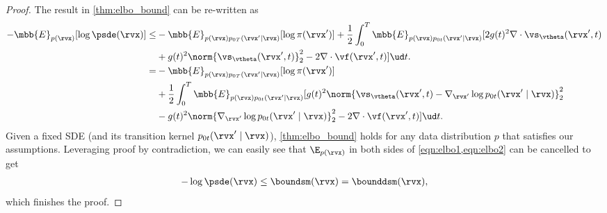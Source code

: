 \pointelbo*
\begin{proof}
The result in \cref{thm:elbo_bound} can be re-written as
\begin{align*}
-\mbb{E}_{p(\rvx)}[\log \psde(\rvx)] 
\leq & -\mbb{E}_{p(\rvx)p_{0T}(\rvx' \mid \rvx)}[\log \pi(\rvx')] 
+ \frac{1}{2}\int_{0}^T \mbb{E}_{p(\rvx)p_{0t}(\rvx'\mid \rvx)}[2g(t)^2 \nabla \cdot \vs_\vtheta(\rvx', t) \notag \\
&+ g(t)^2 \norm{\vs_\vtheta(\rvx', t)}_2^2 -2 \nabla \cdot \vf(\rvx', t)] \ud t.\\
=&  -\mbb{E}_{p(\rvx)p_{0T}(\rvx' \mid \rvx)}[\log \pi(\rvx')]  \notag \\
&+ \frac{1}{2}\int_{0}^T \mbb{E}_{p(\rvx)p_{0t}(\rvx' \mid \rvx)}[g(t)^2 \norm{\vs_\vtheta(\rvx', t) - \nabla_{\rvx'} \log p_{0t}(\rvx' \mid \rvx)}_2^2 \notag\\
&- g(t)^2\norm{\nabla_{\rvx'} \log p_{0t}(\rvx' \mid \rvx)}_2^2 -2 \nabla \cdot \vf(\rvx', t)] \ud t.
\end{align*}
Given a fixed SDE (and its transition kernel $p_{0t}(\rvx' \mid \rvx)$), \cref{thm:elbo_bound} holds for any data distribution $p$ that satisfies our assumptions. Leveraging proof by contradiction, we can easily see that $\E_{p(\rvx)}$ in both sides of \cref{eqn:elbo1,eqn:elbo2} can be cancelled to get 
\begin{align*}
    -\log \psde(\rvx) \leq \boundsm(\rvx) = \bounddsm(\rvx),
\end{align*}
which finishes the proof.
\end{proof}


